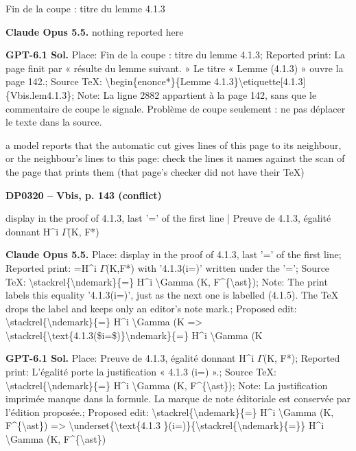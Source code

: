 Fin de la coupe : titre du lemme 4.1.3\par
\textbf{Claude Opus 5.5.} nothing reported here\par
\textbf{GPT-6.1 Sol.} Place: Fin de la coupe : titre du lemme 4.1.3; Reported print: La page finit par « résulte du lemme suivant. » Le titre « Lemme (4.1.3) » ouvre la page 142.; Source TeX: \textbackslash{}begin\{enonce*\}\{Lemme 4.1.3\}\textbackslash{}etiquette[4.1.3]\{Vbis.lem4.1.3\}; Note: La ligne 2882 appartient à la page 142, sans que le commentaire de coupe le signale. Problème de coupe seulement : ne pas déplacer le texte dans la source.\par
a model reports that the automatic cut gives lines of this page to its neighbour, or the neighbour's lines to this page: check the lines it names against the scan of the page that prints them (that page's checker did not have their TeX)\par
\par\noindent\hypertarget{DP0320}{}\textbf{DP0320 -- Vbis, p. 143 (conflict)}\par
display in the proof of 4.1.3, last '=\allowbreak ' of the first line | Preuve de 4.1.3, égalité donnant H\textasciicircum{}i \ensuremath{\Gamma}(K, F*)\par
\textbf{Claude Opus 5.5.} Place: display in the proof of 4.1.3, last '=\allowbreak ' of the first line; Reported print: =\allowbreak  H\textasciicircum{}i \ensuremath{\Gamma}(K,F*) with '4.1.3(i=)' written under the '=\allowbreak '; Source TeX: \textbackslash{}stackrel\{\textbackslash{}ndemark\}\{=\allowbreak \} H\textasciicircum{}i \textbackslash{}Gamma (K, F\textasciicircum{}\{\textbackslash{}ast\}); Note: The print labels this equality '4.1.3(i=)', just as the next one is labelled (4.1.5). The TeX drops the label and keeps only an editor's note mark.; Proposed edit: \textbackslash{}stackrel\{\textbackslash{}ndemark\}\{=\allowbreak \} H\textasciicircum{}i \textbackslash{}Gamma (K =\allowbreak > \textbackslash{}stackrel\{\textbackslash{}text\{4.1.3(\$i=\$)\}\textbackslash{}ndemark\}\{=\allowbreak \} H\textasciicircum{}i \textbackslash{}Gamma (K\par
\textbf{GPT-6.1 Sol.} Place: Preuve de 4.1.3, égalité donnant H\textasciicircum{}i \ensuremath{\Gamma}(K, F*); Reported print: L'égalité porte la justification « 4.1.3 (i=) ».; Source TeX: \textbackslash{}stackrel\{\textbackslash{}ndemark\}\{=\allowbreak \} H\textasciicircum{}i \textbackslash{}Gamma (K, F\textasciicircum{}\{\textbackslash{}ast\}); Note: La justification imprimée manque dans la formule. La marque de note éditoriale est conservée par l'édition proposée.; Proposed edit: \textbackslash{}stackrel\{\textbackslash{}ndemark\}\{=\allowbreak \} H\textasciicircum{}i \textbackslash{}Gamma (K, F\textasciicircum{}\{\textbackslash{}ast\}) =\allowbreak > \textbackslash{}underset\{\textbackslash{}text\{4.1.3 \}(i=)\}\{\textbackslash{}stackrel\{\textbackslash{}ndemark\}\{=\allowbreak \}\} H\textasciicircum{}i \textbackslash{}Gamma (K, F\textasciicircum{}\{\textbackslash{}ast\})\par
